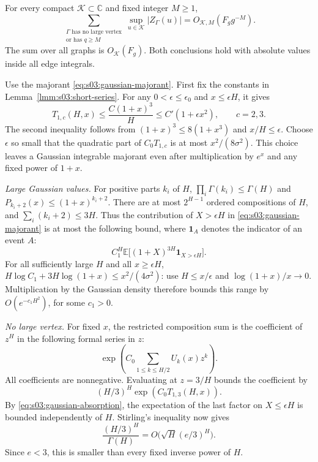 \begin{prp}
\label{prp:s03:graph-tail}
For every compact $\mathcal K\subset\mathbb C$ and fixed integer
$M\geq1$,
\begin{equation}
\label{eq:s03:graph-tail}
\sum_{\substack{\Gamma\text{ has no large vertex}\\
 \text{or has }q\geq M}}
 \sup_{u\in\mathcal K}|Z_\Gamma(u)|
=O_{\mathcal K,M}(F_g g^{-M}).
\end{equation}
The sum over all graphs is $O_{\mathcal K}(F_g)$.
Both conclusions hold with absolute values inside all edge integrals.
\end{prp}
\begin{prf}
Use the majorant \eqref{eq:s03:gaussian-majorant}. First fix the
constants in Lemma~\ref{lmm:s03:short-series}. For any
$0<\epsilon\leq\epsilon_0$ and $x\leq\epsilon H$, it gives
\begin{equation}
\label{eq:s03:gaussian-absorption}
T_{1,c}(H,x)\leq\frac{C(1+x)^3}{H}
\leq C'(1+\epsilon x^2),\qquad c=2,3.
\end{equation}
The second inequality follows from
$(1+x)^3\leq8(1+x^3)$ and $x/H\leq\epsilon$.
Choose $\epsilon$ so small that the quadratic part of
$C_0T_{1,c}$ is at most $x^2/(8\sigma^2)$. This choice leaves a
Gaussian integrable majorant even after multiplication by $e^x$ and
any fixed power of $1+x$.

\smallskip\noindent
\emph{Large Gaussian values.}
For positive parts $k_i$ of $H$,
$\prod_i\Gamma(k_i)\leq\Gamma(H)$ and
$P_{k_i+2}(x)\leq(1+x)^{k_i+2}$.
There are at most $2^{H-1}$ ordered compositions of $H$, and
$\sum_i(k_i+2)\leq3H$. Thus the contribution of $X>\epsilon H$
in \eqref{eq:s03:gaussian-majorant} is at most the following bound,
where $\mathbf1_A$ denotes the indicator of an event $A$:
\[
C_1^H\mathbb E\bigl[(1+X)^{3H}\mathbf1_{X>\epsilon H}\bigr].
\]
For all sufficiently large $H$ and all $x\geq\epsilon H$,
$H\log C_1+3H\log(1+x)\leq x^2/(4\sigma^2)$:
use $H\leq x/\epsilon$ and $\log(1+x)/x\longrightarrow0$.
Multiplication by the Gaussian density therefore bounds this range
by $O(e^{-c_1H^2})$, for some $c_1>0$.

\smallskip\noindent
\emph{No large vertex.}
For fixed $x$, the restricted composition sum is the coefficient of
$z^H$ in the following formal series in $z$:
\[
\exp\left(C_0\sum_{1\leq k\leq H/2}U_k(x)z^k\right).
\]
All coefficients are nonnegative. Evaluating at $z=3/H$ bounds
the coefficient by
\[
(H/3)^H\exp(C_0T_{1,3}(H,x)).
\]
By \eqref{eq:s03:gaussian-absorption}, the expectation of the last
factor on $X\leq\epsilon H$ is bounded independently of $H$.
Stirling's inequality now gives
\[
\frac{(H/3)^H}{\Gamma(H)}
=O\bigl(\sqrt H(e/3)^H\bigr).
\]
Since $e<3$, this is smaller than every fixed inverse power of $H$.


\end{prf}
